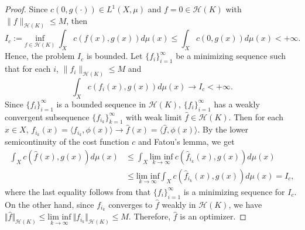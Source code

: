 \documentclass{amsart}
\numberwithin{equation}{section}
\theoremstyle{plain}
\theoremstyle{remark}
\theoremstyle{definition}
\begin{document}
\begin{proof}
Since  $c(0, g(\cdot)) \in L^1(X,\mu)$ and $f=0 \in \mathscr{H}(K)$ with $\|f\|_{\mathscr{H}(K)} \leq M$, then 
 \begin{equation*}
   I_c:= \underset{f \in \mathscr{H}(K)}{\text{inf}} \ \int_{X} c( f(x), g(x))  d\mu(x) \leq \int_{X} c(0, g(x)) d\mu(x)  < + \infty.
\end{equation*}
Hence, the problem $I_c$ is bounded. Let $\{f_i\}_{i=1}^{\infty}$ be a minimizing sequence such that for each $i$, $\|f_i\|_{\mathscr{H}(K)} \leq M$ and
\begin{equation*}
     \int_{X} c( f_i(x), g(x))  d\mu(x)  \rightarrow I_c < + \infty.
\end{equation*}
Since $\{f_i\}_{i=1}^{\infty}$ is a bounded sequence in $\mathscr{H}(K)$, $\{f_i\}_{i=1}^{\infty}$ has a weakly convergent subsequence $\{f_{i_k}\}_{k=1}^{\infty}$ with weak limit $\hat{f} \in \mathscr{H}(K)$. Then for each $x \in X$, $f_{i_k}(x)= \langle f_{i_k}, \phi(x) \rangle \rightarrow \hat{f}(x)= \langle \hat{f}, \phi(x) \rangle $.
By the lower semicontinuity of the cost function $c$ and Fatou's lemma, we get 
\begin{equation*}
\begin{split}
    \int_{X}  c( \hat{f}(x), g(x)) d\mu(x) &\leq \int_{X}  \underset{k \rightarrow \infty}{\text{lim inf}} \ c( \hat{f}_{i_k}(x), g(x)) d\mu(x) \\
    &\leq  \underset{k \rightarrow \infty}{\text{lim inf}} \int_{X}  c( \hat{f}_{i_k}(x), g(x)) d\mu(x) =I_c,
\end{split}
\end{equation*}
where the last equality follows from that $\{f_i\}_{i=1}^{\infty}$ is a minimizing sequence for $I_c$.
On the other hand, since $f_{i_k}$ converges to $\hat{f}$ weakly in $\mathscr{H}(K)$, we have $\Vert \hat{f} \Vert_{\mathscr{H}(K)} \leq  \underset{k \rightarrow \infty}{\text{lim inf}}  \ \Vert f_{i_k} \Vert_{\mathscr{H}(K)} \leq M.$
Therefore, $\hat{f}$ is an optimizer.


\end{proof}
\end{document}

